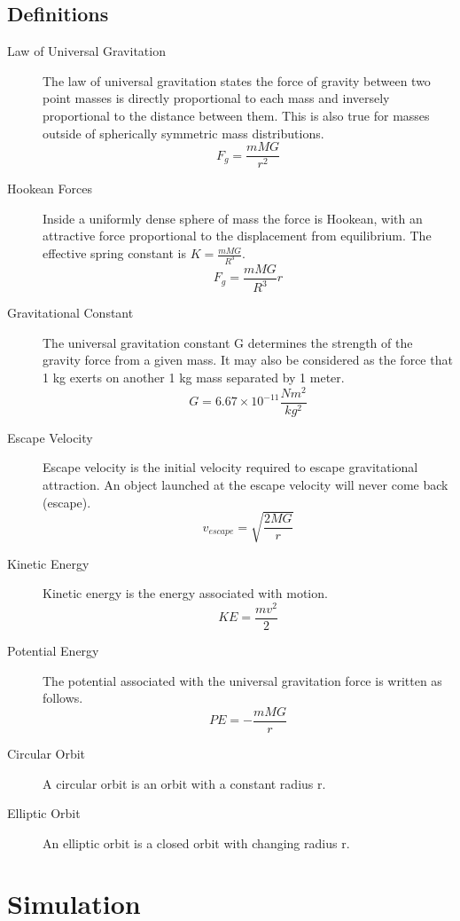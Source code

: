 \documentclass{article}
\begin{document}
\subsection{Definitions}
\label{definitions}
\begin{description}
\item[Law of Universal Gravitation]
The law of universal gravitation states the force of gravity between two point masses is directly proportional to each mass and inversely proportional to the distance between them.  This is also true for masses outside of spherically symmetric mass distributions.\cite{Homer:2014}
$$ F_g=\frac{mMG}{r^2}$$
\item[Hookean Forces]
Inside a uniformly dense sphere of mass the force is Hookean, with an attractive force proportional to the displacement from equilibrium.  The effective spring constant is $K=\frac{mMG}{R^3}$.
$$ F_g=\frac{mMG}{R^3}r$$
\item[Gravitational Constant]
The universal gravitation constant G determines the strength of the gravity force from a given mass.  It may also be considered as the force that 1 kg exerts on another 1 kg mass separated by 1 meter.\\
$$G=6.67\times 10^{-11}\frac{Nm^2}{kg^2}$$
\item[Escape Velocity]
Escape velocity is the initial velocity required to escape gravitational attraction.  An object launched at the escape velocity will never come back (escape).\\
$$v_{escape}=\sqrt{\frac{2MG}{r}}$$
\item[Kinetic Energy]
Kinetic energy is the energy associated with motion.  \\
$$KE=\frac{mv^2}{2}$$
\item[Potential Energy]
The potential associated with the universal gravitation force is written as follows.  \\
$$PE=-\frac{mMG}{r}$$
\item[Circular Orbit]
A circular orbit is an orbit with a constant radius r.
\item[Elliptic Orbit]
An elliptic orbit is a closed orbit with changing radius r.
\end{description} 
 

\section{Simulation}
\end{document}
